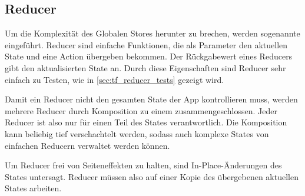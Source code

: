 \subsection{Reducer}
\label{ssec:gr_reducer}

Um die Komplexität des Globalen Stores herunter zu brechen, werden sogenannte
 eingeführt.  Reducer sind einfache Funktionen, die
als Parameter den aktuellen State und eine Action übergeben bekommen.  Der
Rückgabewert eines Reducers gibt den aktualisierten State an.  Durch diese
Eigenschaften sind Reducer sehr einfach zu Testen, wie in
\cref{sec:tf_reducer_tests} gezeigt wird.

Damit ein Reducer nicht den gesamten State der App kontrollieren muss, werden
mehrere Reducer durch Komposition zu einem zusammengeschlossen.  Jeder Reducer
ist also nur für einen Teil des States verantwortlich.  Die Komposition kann
beliebig tief verschachtelt werden, sodass auch komplexe States von einfachen
Reducern verwaltet werden können.

Um Reducer frei von Seiteneffekten zu halten, sind In-Place-Änderungen des
States untersagt.  Reducer müssen also auf einer Kopie des übergebenen aktuellen
States arbeiten.
